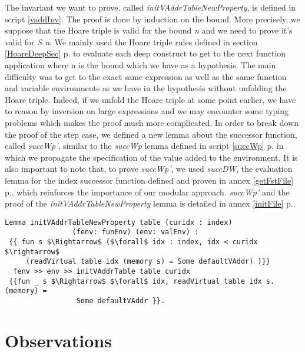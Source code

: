 The invariant we want to prove, called \textit{initVAddrTableNewProperty}, is defined in script \ref{vaddInv}. The proof is done by induction on the bound. More precisely, we suppose that the Hoare triple is valid for the bound \textit{n} and we need to prove it's valid for \textit{S n}. We mainly used the Hoare triple rules defined in section \ref{HoareDeepSec} p.\pageref{HoareDeepSec} to evaluate each deep construct to get to the next function application where n is the bound which we have as a hypothesis. The main difficulty was to get to the exact same expression as well as the same function and variable environments as we have in the hypothesis without unfolding the Hoare triple. Indeed, if we unfold the Hoare triple at some point earlier, we have to reason by inversion on large expressions and we may encounter some typing problems which makes the proof much more complicated. In order to break down the proof of the step case, we defined a new lemma about the successor function, called \textit{succWp'}, similar to the \textit{succWp} lemma defined in script \ref{succWp} p\pageref{succWp}, in which we propagate the specification of the value added to the environment.  It is also important to note that, to prove \textit{succWp'}, we used \textit{succDW}, the evaluation lemma for the index successor function defined and proven in annex \ref{getFstFile} p.\pageref{getFstFile}, which reinforces the importance of our modular approach. \textit{succWp'} and the proof of the \textit{initVAddrTableNewProperty} lemma is detailed in annex \ref{initFile} p.\pageref{initFile}.
\begin{lstlisting}[caption = {initVAddrTableNewProperty invariant in the deep embedding}, xleftmargin=-.07\textwidth,
xrightmargin=-.07\textwidth,mathescape=true, label={vaddInv}]
Lemma initVAddrTableNewProperty table (curidx : index) 
                (fenv: funEnv) (env: valEnv) :
 {{ fun s $\Rightarrow$ ($\forall$ idx : index, idx < curidx $\rightarrow$ 
     (readVirtual table idx (memory s) = Some defaultVAddr) )}} 
  fenv >> env >> initVAddrTable table curidx 
 {{fun _ s $\Rightarrow$ $\forall$ idx, readVirtual table idx s.(memory) = 
 	             Some defaultVAddr }}. 
\end{lstlisting}	


\section{Observations}

